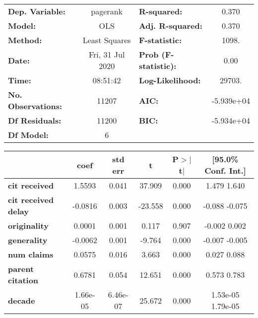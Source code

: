 \begin{center}
\begin{tabular}{lclc}
\toprule
\textbf{Dep. Variable:}     &     pagerank     & \textbf{  R-squared:         } &      0.370    \\
\textbf{Model:}             &       OLS        & \textbf{  Adj. R-squared:    } &      0.370    \\
\textbf{Method:}            &  Least Squares   & \textbf{  F-statistic:       } &      1098.    \\
\textbf{Date:}              & Fri, 31 Jul 2020 & \textbf{  Prob (F-statistic):} &      0.00     \\
\textbf{Time:}              &     08:51:42     & \textbf{  Log-Likelihood:    } &     29703.    \\
\textbf{No. Observations:}  &       11207      & \textbf{  AIC:               } &  -5.939e+04   \\
\textbf{Df Residuals:}      &       11200      & \textbf{  BIC:               } &  -5.934e+04   \\
\textbf{Df Model:}          &           6      & \textbf{                     } &               \\
\bottomrule
\end{tabular}
\begin{tabular}{lccccc}
                            & \textbf{coef} & \textbf{std err} & \textbf{t} & \textbf{P$>$$|$t$|$} & \textbf{[95.0\% Conf. Int.]}  \\
\midrule
\textbf{cit received}       &       1.5593  &        0.041     &    37.909  &         0.000        &         1.479     1.640       \\
\textbf{cit received delay} &      -0.0816  &        0.003     &   -23.558  &         0.000        &        -0.088    -0.075       \\
\textbf{originality}        &       0.0001  &        0.001     &     0.117  &         0.907        &        -0.002     0.002       \\
\textbf{generality}         &      -0.0062  &        0.001     &    -9.764  &         0.000        &        -0.007    -0.005       \\
\textbf{num claims}         &       0.0575  &        0.016     &     3.663  &         0.000        &         0.027     0.088       \\
\textbf{parent citation}    &       0.6781  &        0.054     &    12.651  &         0.000        &         0.573     0.783       \\
\textbf{decade}             &     1.66e-05  &     6.46e-07     &    25.672  &         0.000        &      1.53e-05  1.79e-05       \\

\end{tabular}
\end{center}
